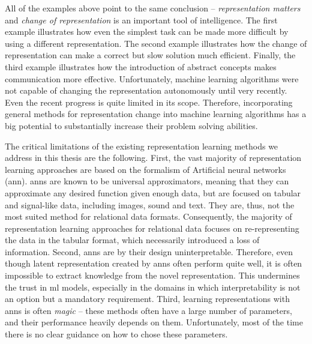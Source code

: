 All of the examples above point to the same conclusion -- \textit{representation matters} and \textit{change of representation} is an important tool of intelligence.
The first example illustrates how even the simplest task can be made more difficult by using a different representation.
The second example illustrates how the change of representation can make a correct but slow solution much efficient.
Finally, the third example illustrates how the introduction of abstract concepts makes communication more effective.
Unfortunately, machine learning algorithms were not capable of changing the representation autonomously until very recently.
Even the recent progress is quite limited in its scope.
Therefore, incorporating general methods for representation change into machine learning algorithms has a big potential to substantially increase their problem solving abilities.






The critical limitations of the existing representation learning methods we address in this thesis are the  following.
First, the vast majority of representation learning approaches are based on the formalism of Artificial neural networks (\gls{ann}).
\gls{ann}s are known to be universal approximators, meaning that they can approximate any desired function given enough data, but are focused on tabular and signal-like data, including images, sound and text.
They are, thus, not the most suited method for relational data formats.
Consequently, the majority of representation learning approaches for relational data focuses on re-representing the data in the tabular format, which necessarily introduced a loss of information.
Second, \gls{ann}s are by their design uninterpretable.
Therefore, even though latent representation created by \gls{ann}s often perform quite well, it is often impossible to extract knowledge from the novel representation.
This undermines the trust in \gls{ml} models, especially in the domains in which interpretability is not an option but a mandatory requirement.
Third, learning representations with \gls{ann}s is often \textit{magic} --  these methods often have a large number of parameters, and their performance heavily depends on them.
Unfortunately, most of the time there is no clear guidance on how to chose these parameters.








